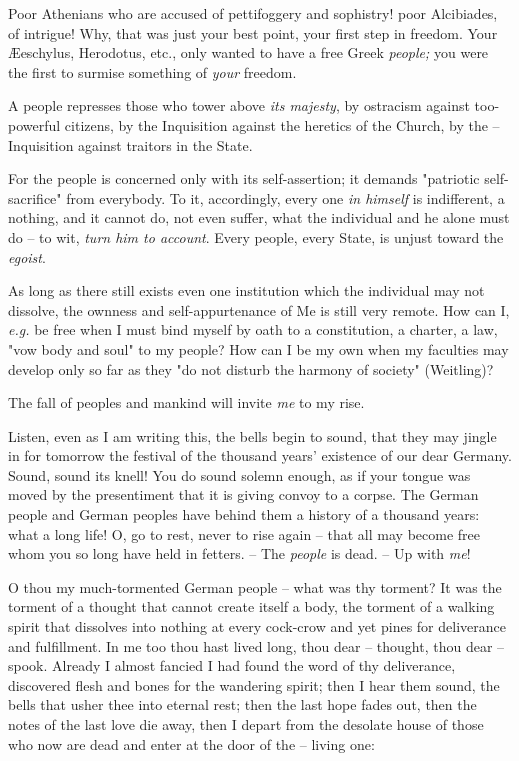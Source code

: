 Poor Athenians who are accused of pettifoggery and sophistry! poor Alcibiades, 
of intrigue! Why, that was just your best point, your first step in freedom. 
Your \AE{}eschylus, Herodotus, etc., only wanted to have a free Greek 
\textit{people;} you were the first to surmise something of \textit{your} 
freedom.

A people represses those who tower above \textit{its majesty}, by ostracism 
against too-powerful citizens, by the Inquisition against the heretics of the 
Church, by the -- Inquisition against traitors in the State.

For the people is concerned only with its self-assertion; it demands 
"{}patriotic self-sacrifice"{} from everybody. To it, accordingly, every one 
\textit{in himself} is indifferent, a nothing, and it cannot do, not even 
suffer, what the individual and he alone must do -- to wit, \textit{turn him 
to account}. Every people, every State, is unjust toward the \textit{egoist}.

As long as there still exists even one institution which the individual may 
not dissolve, the ownness and self-appurtenance of Me is still very remote. 
How can I, \textit{e.g.} be free when I must bind myself by oath to a 
constitution, a charter, a law, "{}vow body and soul"{} to my people? How can 
I be my own when my faculties may develop only so far as they "{}do not 
disturb the harmony of society"{} (Weitling)?

The fall of peoples and mankind will invite \textit{me} to my rise.

Listen, even as I am writing this, the bells begin to sound, that they may 
jingle in for tomorrow the festival of the thousand years' existence of our 
dear Germany. Sound, sound its knell! You do sound solemn enough, as if your 
tongue was moved by the presentiment that it is giving convoy to a corpse. The 
German people and German peoples have behind them a history of a thousand 
years: what a long life! O, go to rest, never to rise again -- that all may 
become free whom you so long have held in fetters. -- The \textit{people} is 
dead. -- Up with \textit{me}!

O thou my much-tormented German people -- what was thy torment? It was the 
torment of a thought that cannot create itself a body, the torment of a 
walking spirit that dissolves into nothing at every cock-crow and yet pines 
for deliverance and fulfillment. In me too thou hast lived long, thou dear -- 
thought, thou dear -- spook. Already I almost fancied I had found the word of 
thy deliverance, discovered flesh and bones for the wandering spirit; then I 
hear them sound, the bells that usher thee into eternal rest; then the last 
hope fades out, then the notes of the last love die away, then I depart from 
the desolate house of those who now are dead and enter at the door of the -- 
living one:

